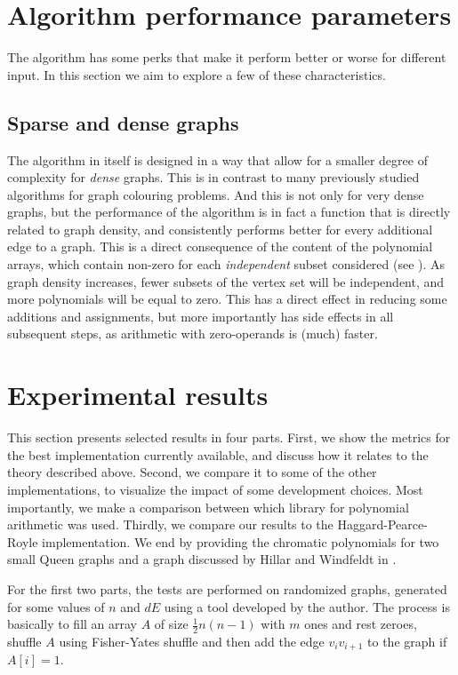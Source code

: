 \documentclass[a4paper]{article}
\begin{document}
\section{Algorithm performance parameters}
The algorithm has some perks that make it perform better or worse for different input. In this section we aim to explore a few of these characteristics.

\subsection{Sparse and dense graphs}\label{sparsedense}
The algorithm in itself is designed in a way that allow for a smaller degree of complexity for \emph{dense} graphs. This is in contrast to many previously studied algorithms for graph colouring problems. And this is not only for very dense graphs, but the performance of the algorithm is in fact a function that is directly related to graph density, and consistently performs better for every additional edge to a graph. This is a direct consequence of the content of the polynomial arrays, which contain non-zero for each \emph{independent} subset considered (see \cite[p. 9, steps 2b and 2c]{cov_pack}). As graph density increases, fewer subsets of the vertex set will be independent, and more polynomials will be equal to zero. This has a direct effect in reducing some additions and assignments, but more importantly has side effects in all subsequent steps, as arithmetic with zero-operands is (much) faster.

\section{Experimental results}
This section presents selected results in four parts. First, we show the metrics for the best implementation currently available, and discuss how it relates to the theory described above. Second, we compare it to some of the other implementations, to visualize the impact of some development choices. Most importantly, we make a comparison between which library for polynomial arithmetic was used. Thirdly, we compare our results to the Haggard-Pearce-Royle implementation.
We end by providing the chromatic polynomials for two small Queen graphs and a graph discussed by Hillar and Windfeldt in \cite{hillar_windfeldt}. 

For the first two parts, the tests are performed on randomized graphs, generated for some values of $n$ and $dE$ using a tool developed by the author. The process is basically to fill an array $A$ of size $\frac{1}{2}n(n-1)$ with $m$ ones and rest zeroes, shuffle $A$ using Fisher-Yates shuffle and then add the edge $v_iv_{i+1}$ to the graph if $A[i] = 1$.
\end{document}
